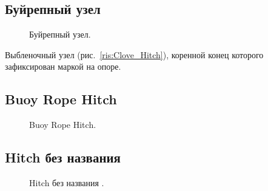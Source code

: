 \subsection{Буйрепный узел}

\begin{figure}[H]\centering
	\begin{minipage}{1\linewidth}
		\begin{center}
			\tcbox[enhanced jigsaw,colframe=black,opacityframe=0.5,opacityback=0.5]
			{\centering{}}
		\end{center}
	\end{minipage}
\caption{Буйрепный узел.}
\label{ris:Buoyrope}
\end{figure}

Выбленочный узел (рис.~\ref{ris:Clove_Hitch}), коренной конец которого зафиксирован маркой на опоре.

\subsection{Buoy Rope Hitch}

\begin{figure}[H]\centering
	\begin{minipage}{1\linewidth}
		\begin{center}
			\tcbox[enhanced jigsaw,colframe=black,opacityframe=0.5,opacityback=0.5]
			{\centering{}}
		\end{center}
	\end{minipage}
\caption{Buoy Rope Hitch.}
\label{ris:Buoy_Rope_Hitch}
\end{figure}

\addtocounter{HitchNoName}{1}

\subsection{Hitch без названия }

\begin{figure}[H]\centering
	\begin{minipage}{1\linewidth}
		\begin{center}
			\tcbox[enhanced jigsaw,colframe=black,opacityframe=0.5,opacityback=0.5]
			{\centering{}}
		\end{center}
	\end{minipage}
\caption{Hitch без названия .}
\label{ris:Hitch_noname_12}
\end{figure}

